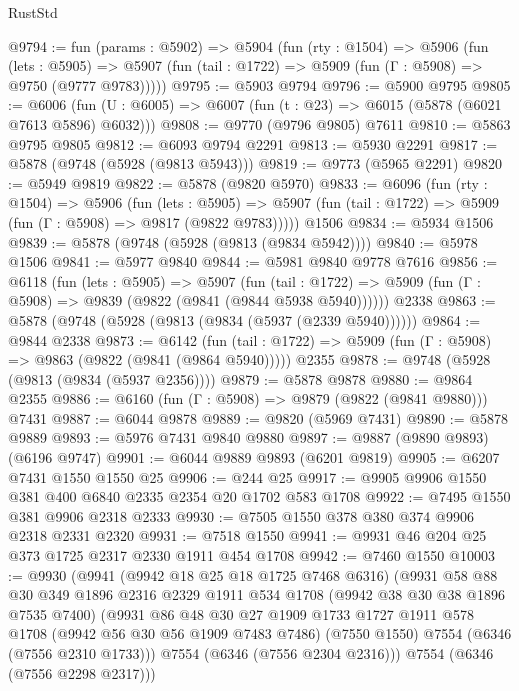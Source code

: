 \begin{lexlean}{RustStd}
\begin{coremodule}
@9794 := fun (params : @5902) =>
  @5904
    (fun (rty : @1504) =>
    @5906
      (fun (lets : @5905) =>
      @5907 (fun (tail : @1722) => @5909 (fun (Γ : @5908) => @9750 (@9777 @9783)))))
@9795 := @5903 @9794
@9796 := @5900 @9795
@9805 := @6006 (fun (U : @6005) => @6007 (fun (t : @23) => @6015 (@5878 (@6021 @7613 @5896) @6032)))
@9808 := @9770 (@9796 @9805) @7611
@9810 := @5863 @9795 @9805
@9812 := @6093 @9794 @2291
@9813 := @5930 @2291
@9817 := @5878 (@9748 (@5928 (@9813 @5943)))
@9819 := @9773 (@5965 @2291)
@9820 := @5949 @9819
@9822 := @5878 (@9820 @5970)
@9833 := @6096
    (fun (rty : @1504) =>
    @5906
      (fun (lets : @5905) =>
      @5907 (fun (tail : @1722) => @5909 (fun (Γ : @5908) => @9817 (@9822 @9783)))))
    @1506
@9834 := @5934 @1506
@9839 := @5878 (@9748 (@5928 (@9813 (@9834 @5942))))
@9840 := @5978 @1506
@9841 := @5977 @9840
@9844 := @5981 @9840 @9778 @7616
@9856 := @6118
    (fun (lets : @5905) =>
    @5907
      (fun (tail : @1722) => @5909 (fun (Γ : @5908) => @9839 (@9822 (@9841 (@9844 @5938 @5940))))))
    @2338
@9863 := @5878 (@9748 (@5928 (@9813 (@9834 (@5937 (@2339 @5940))))))
@9864 := @9844 @2338
@9873 := @6142
    (fun (tail : @1722) => @5909 (fun (Γ : @5908) => @9863 (@9822 (@9841 (@9864 @5940)))))
    @2355
@9878 := @9748 (@5928 (@9813 (@9834 (@5937 @2356))))
@9879 := @5878 @9878
@9880 := @9864 @2355
@9886 := @6160 (fun (Γ : @5908) => @9879 (@9822 (@9841 @9880))) @7431
@9887 := @6044 @9878
@9889 := @9820 (@5969 @7431)
@9890 := @5878 @9889
@9893 := @5976 @7431 @9840 @9880
@9897 := @9887 (@9890 @9893) (@6196 @9747)
@9901 := @6044 @9889 @9893 (@6201 @9819)
@9905 := @6207 @7431 @1550 @1550 @25
@9906 := @244 @25
@9917 := @9905 @9906 @1550 @381 @400 @6840 @2335 @2354 @20 @1702 @583 @1708
@9922 := @7495 @1550 @381 @9906 @2318 @2333
@9930 := @7505 @1550 @378 @380 @374 @9906 @2318 @2331 @2320
@9931 := @7518 @1550
@9941 := @9931 @46 @204 @25 @373 @1725 @2317 @2330 @1911 @454 @1708
@9942 := @7460 @1550
@10003 := @9930
    (@9941
      (@9942 @18 @25 @18 @1725 @7468 @6316)
      (@9931
        @58
        @88
        @30
        @349
        @1896
        @2316
        @2329
        @1911
        @534
        @1708
        (@9942 @38 @30 @38 @1896 @7535 @7400)
        (@9931
          @86
          @48
          @30
          @27
          @1909
          @1733
          @1727
          @1911
          @578
          @1708
          (@9942 @56 @30 @56 @1909 @7483 @7486)
          (@7550 @1550)
          @7554
          (@6346 (@7556 @2310 @1733)))
        @7554
        (@6346 (@7556 @2304 @2316)))
      @7554
      (@6346 (@7556 @2298 @2317)))

\end{coremodule}
\end{lexlean}
